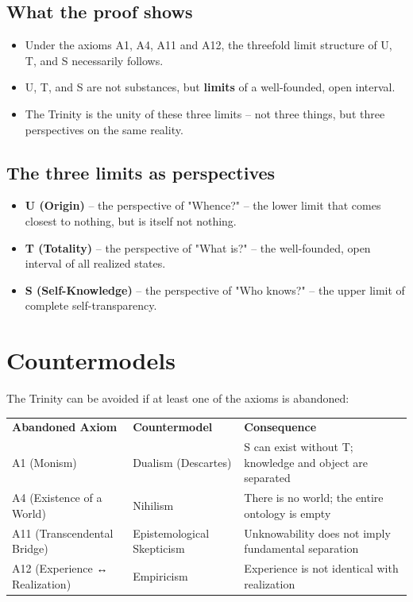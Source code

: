 \documentclass[
]{article}
\begin{document}
\subsection{What the proof shows}\label{what-the-proof-shows}

\begin{itemize}
\item Under the axioms A1, A4, A11 and A12, the threefold limit structure of U, T, and S necessarily follows.
\item U, T, and S are not substances, but \textbf{limits} of a well-founded, open interval.
\item The Trinity is the unity of these three limits – not three things, but three perspectives on the same reality.
\end{itemize}

\subsection{The three limits as perspectives}\label{the-three-limits-as-perspectives}

\begin{itemize}
\item \textbf{U (Origin)} – the perspective of "Whence?" – the lower limit that comes closest to nothing, but is itself not nothing.
\item \textbf{T (Totality)} – the perspective of "What is?" – the well-founded, open interval of all realized states.
\item \textbf{S (Self-Knowledge)} – the perspective of "Who knows?" – the upper limit of complete self-transparency.
\end{itemize}

\section{Countermodels}\label{countermodels}

The Trinity can be avoided if at least one of the axioms is abandoned:

\begin{tabular}{lll}
\textbf{Abandoned Axiom} & \textbf{Countermodel} & \textbf{Consequence} \\
A1 (Monism) & Dualism (Descartes) & S can exist without T; knowledge and object are separated \\
A4 (Existence of a World) & Nihilism & There is no world; the entire ontology is empty \\
A11 (Transcendental Bridge) & Epistemological Skepticism & Unknowability does not imply fundamental separation \\
A12 (Experience ↔ Realization) & Empiricism & Experience is not identical with realization \\
\end{tabular}
\end{document}
